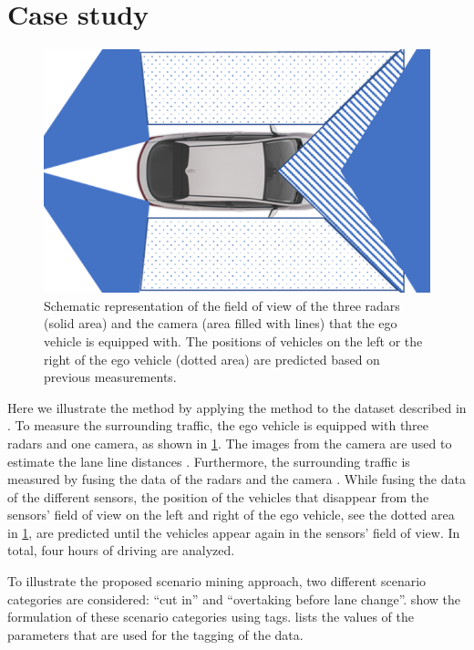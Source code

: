 \section{Case study}
\label{sec:case study}

\begin{figure}
	\centering
	\includegraphics[width=.8\linewidth]{figures/sensors}
	\caption{\cstartd Schematic representation of the field of view of the three radars (solid area) and the camera (area filled with lines) that the ego vehicle is equipped with. The positions of vehicles on the left or the right of the ego vehicle (dotted area) are predicted based on previous measurements.\cendd}
	\label{fig:sensors}
\end{figure}

Here we illustrate the method by applying the method to the dataset described in \autocite{paardekooper2019dataset6000km}.
\cstartd To measure the surrounding traffic, the ego vehicle is equipped with three radars and one camera, as shown in \cref{fig:sensors}.
The images from the camera are used to estimate the lane line distances \autocite{elfring2016effective}.
Furthermore, the surrounding traffic is measured by fusing the data of the radars and the camera \autocite{elfring2016effective}.
While fusing the data of the different sensors, the position of the vehicles that disappear from the sensors' field of view on the left and right of the ego vehicle, see the dotted area in \cref{fig:sensors}, are predicted until the vehicles appear again in the sensors' field of view.
In total, four hours of driving are analyzed.
\cendd

\cstartd To illustrate the proposed scenario mining approach, two different scenario categories are considered: ``cut in'' and ``overtaking before lane change''.
 show the formulation of these scenario categories using tags.
 lists the values of the parameters that are used for the tagging of the data.
\cendd

